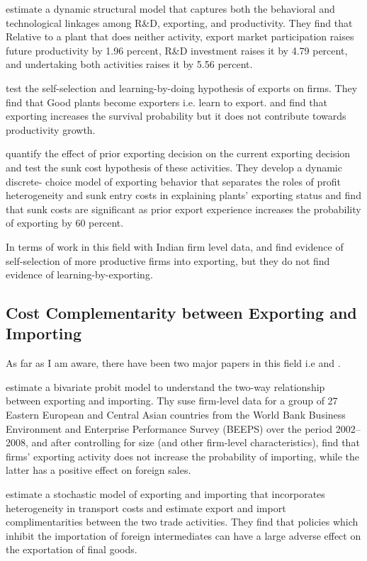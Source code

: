 \documentclass[11pt]{article}
\begin{document}
\textcite{aw2011}  estimate a dynamic structural model that captures both the behavioral
and technological linkages among R\&D, exporting, and
productivity. They find that Relative to a
plant that does neither activity, export market participation raises future productivity
by 1.96 percent, R\&D investment raises it by 4.79 percent, and undertaking both
activities raises it by 5.56 percent. 

 \textcite{bernard1999exceptional} test the self-selection and
 learning-by-doing hypothesis of exports on firms. They find that Good
 plants become exporters i.e. learn to export. and find that exporting
 increases the survival probability but it does not contribute towards
 productivity growth.  

\textcite{roberts1997decision} quantify the effect of prior exporting
decision on the current exporting decision and test the sunk cost
hypothesis of these activities.  They  develop a dynamic discrete-
 choice model of exporting behavior that separates the roles of profit heterogeneity
 and sunk entry costs in explaining plants' exporting status and find
 that sunk costs are significant as prior export experience increases
 the probability of exporting by 60 percent.  


In terms of work in this field with Indian firm level  data,
\textcite{haidar2012trade} and \textcite{gupta2018exporting} find evidence of
self-selection of more productive firms into exporting, but they do
not find evidence of learning-by-exporting.  
\subsection{Cost Complementarity between Exporting and Importing}
As far as I am aware, there have been two major papers in this field
i.e \textcite{aristei2013firms} and \textcite{kasahara2013productivity}. 

\textcite{aristei2013firms} estimate a bivariate probit model to
understand the two-way relationship between exporting and importing. 
Thy suse  firm-level data for a group of 27 Eastern European and 
Central Asian countries from the World Bank Business Environment 
and Enterprise Performance Survey (BEEPS) over the period 2002–2008, 
and after controlling for size (and other firm-level characteristics),
find that firms’ exporting activity does not increase the
probability of importing, while the latter has a positive effect
 on foreign sales. 

\textcite{kasahara2013productivity} estimate a stochastic model of
exporting and importing that incorporates heterogeneity in transport
costs and estimate export and import complimentarities between the two
trade activities. They find that policies which inhibit the
importation of  foreign intermediates can have a large adverse 
effect on the exportation of final goods.  
\end{document}
